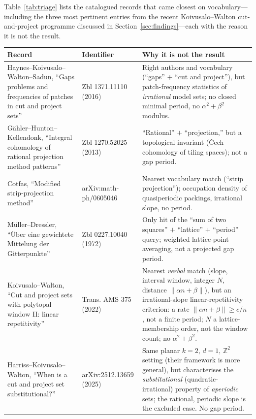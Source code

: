 \documentclass[11pt]{article}
\theoremstyle{plain}
\theoremstyle{remark}
\newcommand{\Z}{\mathbb{Z}}
\begin{document}
Table~\ref{tab:triage} lists the catalogued records that came closest on
vocabulary---including the three most pertinent entries from the recent
Koivusalo--Walton cut-and-project programme discussed in
Section~\ref{sec:findings}---each with the reason it is not the result.

\begin{table}[h]
\centering
\small
\renewcommand{\arraystretch}{1.25}
\begin{tabular}{@{}>{\raggedright}p{4.6cm}>{\raggedright}p{2.4cm}p{7.3cm}@{}}
\toprule
Record & Identifier & Why it is not the result\\
\midrule
Haynes--Koivusalo--Walton--Sadun, ``Gaps problems and frequencies of patches in cut and project sets'' \cite{HaynesEtAl2016}
& Zbl 1371.11110 (2016)
& Right authors and vocabulary (``gaps'' $+$ ``cut and project''), but patch-frequency statistics of \emph{irrational} model sets; no closed minimal period, no $\alpha^2+\beta^2$ modulus.\\
G\"ahler--Hunton--Kellendonk, ``Integral cohomology of rational projection method patterns'' \cite{GaehlerHuntonKellendonk2013}
& Zbl 1270.52025 (2013)
& ``Rational'' $+$ ``projection,'' but a topological invariant (\v{C}ech cohomology of tiling spaces); not a gap period.\\
Cotfas, ``Modified strip-projection method'' \cite{Cotfas2006}
& arXiv:math-ph/0605046
& Nearest vocabulary match (``strip projection''); occupation density of quasiperiodic packings, irrational slope, no period.\\
M\"uller--Dressler, ``\"Uber eine gewichtete Mittelung der Gitterpunkte'' \cite{MuellerDressler1972}
& Zbl 0227.10040 (1972)
& Only hit of the ``sum of two squares'' $+$ ``lattice'' $+$ ``period'' query; weighted lattice-point averaging, not a projected gap period.\\
Koivusalo--Walton, ``Cut and project sets with polytopal window II: linear repetitivity'' \cite{KoivusaloWalton2020}
& Trans. AMS 375 (2022)
& Nearest \emph{verbal} match (slope, interval window, integer $N$, distance $\lVert\alpha n+\beta\rVert$), but an irrational-slope linear-repetitivity criterion: a rate $\lVert\alpha n+\beta\rVert\ge c/n$, not a finite period; $N$ a lattice-membership order, not the window count; no $\alpha^2+\beta^2$.\\
Harriss--Koivusalo--Walton, ``When is a cut and project set substitutional?'' \cite{HarrissKoivusaloWalton2025}
& arXiv:2512.13659 (2025)
& Same planar $k=2$, $d=1$, $\Z^2$ setting (their framework is more general), but characterises the \emph{substitutional} (quadratic-irrational) property of \emph{aperiodic} sets; the rational, periodic slope is the excluded case. No gap period.\\

\end{tabular}
\end{table}
\end{document}
